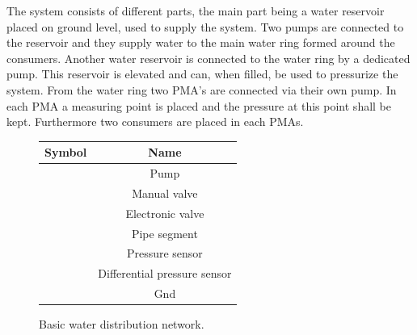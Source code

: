 The system consists of different parts, the main part being a water reservoir placed on ground level, used to supply the system. Two pumps are connected to the reservoir and they supply water to the main water ring formed around the consumers. 
Another water reservoir is connected to the water ring by a dedicated pump. This reservoir is elevated and can, when filled, be used to pressurize the system. 
From the water ring two PMA's are connected via their own pump. In each PMA a measuring point is placed and the pressure at this point shall be kept. Furthermore two consumers are placed in each PMAs.         
	
\begin{figure}
	\centering
	\begin{minipage}[b]{0.4\textwidth}
		\centering
		 
		\caption{Basic water distribution network.}
		\label{fig:Basic_example_sys}
	\end{minipage}
	\hspace{15pt}
	\begin{minipage}[b]{0.4\textwidth}
		\begin{tabular}{|c|c|} \hline
  			\bfseries Symbol 	 					&   \bfseries Name 					\\ \hline
			 		  	&	Pump							\\ \hline
			 	&	Manual valve					\\ \hline
			 		&	Electronic valve				\\ \hline
			 		  	&	Pipe segment					\\ \hline
			 &	Pressure sensor					\\ \hline
			 	&	Differential pressure sensor	\\ \hline
			 		  	&	Gnd								\\ \hline
		\end{tabular}
		\label{tab:sys_comp_overview}
	\end{minipage}
\end{figure}
